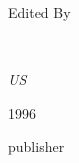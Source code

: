 \begin{titlepage}
	
	\vspace*{3\baselineskip} %
	
	
	Edited By
	
	\vspace{0.5\baselineskip} %
	
	{\scshape\Large \@author \\} %
	
	\vspace{0.5\baselineskip} %
	
	\textit{US} %
	
	\vfill %
	
    \makeatletter

	
    \newcommand{\plogo}{} %

	\plogo %
	
	\vspace{0.3\baselineskip} %
	
	1996 %

	{\large publisher} %

\end{titlepage}


